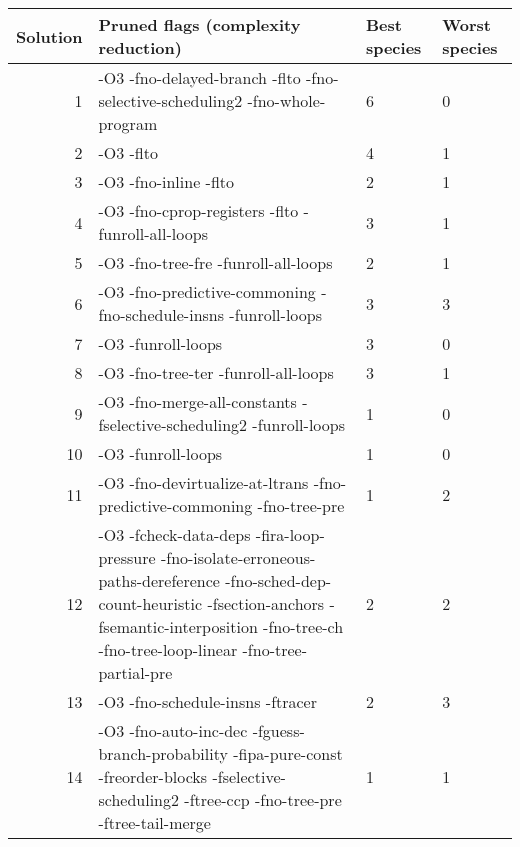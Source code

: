     \begin{tabular}{|r|p{4.5in}|p{0.5in}|p{0.5in}|}
     \hline
     \textbf{Solution} & \textbf{Pruned flags (complexity reduction)} & \textbf{Best species} & \textbf{Worst species} \\ 
     \hline
      1 & -O3 -fno-delayed-branch -flto -fno-selective-scheduling2 -fno-whole-program & 6 & 0 \\
     \hline
      2 & -O3 -flto & 4 & 1 \\
     \hline
      3 & -O3 -fno-inline -flto & 2 & 1 \\
     \hline
      4 & -O3 -fno-cprop-registers -flto -funroll-all-loops & 3 & 1 \\
     \hline
      5 & -O3 -fno-tree-fre -funroll-all-loops & 2 & 1 \\
     \hline
      6 & -O3 -fno-predictive-commoning -fno-schedule-insns -funroll-loops & 3 & 3 \\
     \hline
      7 & -O3 -funroll-loops & 3 & 0 \\
     \hline
      8 & -O3 -fno-tree-ter -funroll-all-loops & 3 & 1 \\
     \hline
      9 & -O3 -fno-merge-all-constants -fselective-scheduling2 -funroll-loops & 1 & 0 \\
     \hline
      10 & -O3 -funroll-loops & 1 & 0 \\
     \hline
      11 & -O3 -fno-devirtualize-at-ltrans -fno-predictive-commoning -fno-tree-pre & 1 & 2 \\
     \hline
      12 & -O3 -fcheck-data-deps -fira-loop-pressure -fno-isolate-erroneous-paths-dereference -fno-sched-dep-count-heuristic -fsection-anchors -fsemantic-interposition -fno-tree-ch -fno-tree-loop-linear -fno-tree-partial-pre & 2 & 2 \\
     \hline
      13 & -O3 -fno-schedule-insns -ftracer & 2 & 3 \\
     \hline
      14 & -O3 -fno-auto-inc-dec -fguess-branch-probability -fipa-pure-const -freorder-blocks -fselective-scheduling2 -ftree-ccp -fno-tree-pre -ftree-tail-merge & 1 & 1 \\
     \hline
    \end{tabular}